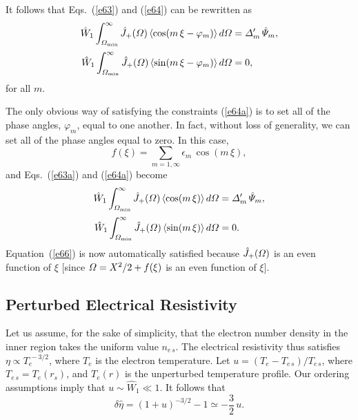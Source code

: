 \documentclass[12pt,prb,aps]{revtex4-1}
\begin{document}
It follows that Eqs.~(\ref{e63}) and (\ref{e64}) can be rewritten as
\begin{align}\label{e63a}
\hat{W}_1\int_{{\mit\Omega}_{\rm min}}^\infty\hat{J}_+({\mit\Omega})\,\langle\cos(m\,\xi-\varphi_m)\rangle\,d{\mit\Omega}&= {\mit\Delta}_m'\,\hat{\mit\Psi}_m,\\[0.5ex]
\hat{W}_1\int_{{\mit\Omega}_{\rm min}}^\infty\hat{J}_+({\mit\Omega})\,\langle\sin(m\,\xi-\varphi_m)\rangle\,d{\mit\Omega}&=0,\label{e64a}
\end{align}
for all $m$. 

The only obvious way of satisfying the constraints (\ref{e64a}) is to set all of the phase angles, $\varphi_m$, equal to
one another. In fact, without loss of generality, we can set all of the phase angles equal to zero. In this case,
\begin{equation}\label{e65}
f(\xi) = \sum_{m=1,\infty} \epsilon_m\,\cos(m\,\xi),
\end{equation}
and Eqs.~(\ref{e63a}) and (\ref{e64a}) become 
\begin{align}\label{e65a}
\hat{W}_1\int_{{\mit\Omega}_{\rm min}}^\infty\hat{J}_+({\mit\Omega})\,\langle\cos(m\,\xi)\rangle\,d{\mit\Omega}&= {\mit\Delta}_m'\,\hat{\mit\Psi}_m,\\[0.5ex]
\hat{W}_1\int_{{\mit\Omega}_{\rm min}}^\infty\hat{J}_+({\mit\Omega})\,\langle\sin(m\,\xi)\rangle\,d{\mit\Omega}&=0.\label{e66}
\end{align}
Equation~(\ref{e66}) is now automatically satisfied because $\hat{J}_+({\mit\Omega})$ is an even function of $\xi$ [since ${\mit\Omega}= X^2/2+f(\xi)$ is an even function of $\xi$]. 

\subsection{Perturbed Electrical Resistivity}
Let us assume, for the sake of simplicity, that the electron
number density in the inner region takes the uniform value
$n_{e\,s}$. The electrical resistivity thus satisfies $\eta\propto
T_e^{\,-3/2}$, where $T_e$ is the electron temperature.\cite{plasma} Let $u=(T_e-T_{e\,s})/T_{e\,s}$, where $T_{e\,s} = T_e(r_s)$, and
$T_e(r)$ is the unperturbed temperature profile. Our ordering assumptions imply that $u\sim \hat{W}_1\ll 1$. It follows
that
\begin{equation}
\delta{\hat\eta} = (1+u)^{-3/2} - 1\simeq -\frac{3}{2}\,u.
\end{equation}
\end{document}
